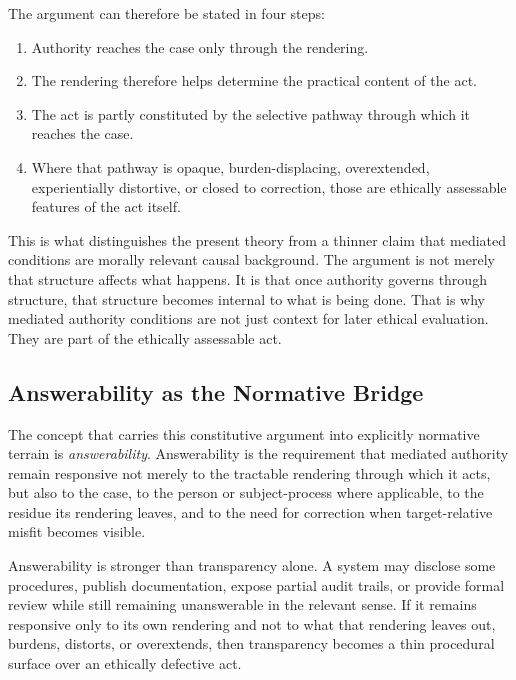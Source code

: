 \documentclass[11pt]{article}
\renewcommand{\emph}[1]{\textit{#1}}
\begin{document}
The argument can therefore be stated in four steps:

\begin{enumerate}
    \item Authority reaches the case only through the rendering.
    \item The rendering therefore helps determine the practical content of the act.
    \item The act is partly constituted by the selective pathway through which it reaches the case.
    \item Where that pathway is opaque, burden-displacing, overextended, experientially distortive, or closed to correction, those are ethically assessable features of the act itself.
\end{enumerate}

This is what distinguishes the present theory from a thinner claim that mediated conditions are morally relevant causal background. The argument is not merely that structure affects what happens. It is that once authority governs through structure, that structure becomes internal to what is being done. That is why mediated authority conditions are not just context for later ethical evaluation. They are part of the ethically assessable act.

\subsection{Answerability as the Normative Bridge}

The concept that carries this constitutive argument into explicitly normative terrain is \emph{answerability}. Answerability is the requirement that mediated authority remain responsive not merely to the tractable rendering through which it acts, but also to the case, to the person or subject-process where applicable, to the residue its rendering leaves, and to the need for correction when target-relative misfit becomes visible. \cite{Swanson2026SharedRealityConditionDisclosure,Swanson2026MediatedJudgmentConstraint,Swanson2026ConstraintConditionDisclosure,Swanson2026EmbeddedProcess}

Answerability is stronger than transparency alone. A system may disclose some procedures, publish documentation, expose partial audit trails, or provide formal review while still remaining unanswerable in the relevant sense. If it remains responsive only to its own rendering and not to what that rendering leaves out, burdens, distorts, or overextends, then transparency becomes a thin procedural surface over an ethically defective act.
\end{document}
